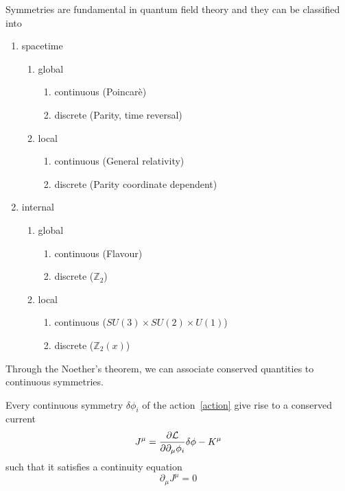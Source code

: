    Symmetries are fundamental in quantum field theory and they can be classified into 
    \begin{enumerate}
        \item spacetime
        \begin{enumerate}
            \item global
            \begin{enumerate}
                \item continuous (Poincarè)
                \item discrete (Parity, time reversal)
            \end{enumerate}
            \item local
            \begin{enumerate}
                \item continuous (General relativity)
                \item discrete (Parity coordinate dependent)
            \end{enumerate}
        \end{enumerate}
        \item internal
        \begin{enumerate}
            \item global
            \begin{enumerate}
                \item continuous (Flavour)
                \item discrete ($\mathbb Z_2$)
            \end{enumerate}
            \item local
            \begin{enumerate}
                \item continuous ($SU(3) \times SU(2) \times U(1)$)
                \item discrete ($\mathbb Z_2 (x)$)
            \end{enumerate}
        \end{enumerate}
    \end{enumerate}

    Through the Noether's theorem, we can associate conserved quantities to continuous symmetries.

    \begin{theorem}[Noether's]
        Every continuous symmetry $\delta \phi_i$ of the action~\eqref{action} give rise to a conserved current 
        \begin{equation}\label{conscurr}
            J^\mu = \frac{\partial\mathcal L}{\partial\partial_\mu \phi_i} \delta \phi - K^\mu
        \end{equation}
        such that it satisfies a continuity equation 
        \begin{equation}\label{cont}
            \partial_\mu J^\mu = 0
        \end{equation}
    \end{theorem}

